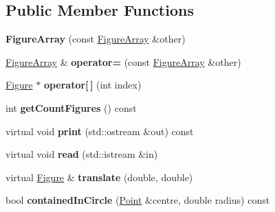 \subsection*{Public Member Functions}
\begin{DoxyCompactItemize}
\item 
\mbox{\label{class_figure_array_aebe53c961441949b5b066ebd58b5bcfc}} 
{\bfseries Figure\+Array} (const \mbox{\hyperlink{class_figure_array}{Figure\+Array}} \&other)
\item 
\mbox{\label{class_figure_array_a0b91d274913d3525a00ad31e39e47353}} 
\mbox{\hyperlink{class_figure_array}{Figure\+Array}} \& {\bfseries operator=} (const \mbox{\hyperlink{class_figure_array}{Figure\+Array}} \&other)
\item 
\mbox{\label{class_figure_array_acfc4b29699b22a7576e976ad9e27d161}} 
\mbox{\hyperlink{class_figure}{Figure}} $\ast$ {\bfseries operator\mbox{[}$\,$\mbox{]}} (int index)
\item 
\mbox{\label{class_figure_array_a897dc4b592ab671c57c03536085bf748}} 
int {\bfseries get\+Count\+Figures} () const
\item 
\mbox{\label{class_figure_array_af405934366bba58d2955c935722c1a5a}} 
virtual void {\bfseries print} (std\+::ostream \&out) const
\item 
\mbox{\label{class_figure_array_a98e620de3aabee70754700bba30d3151}} 
virtual void {\bfseries read} (std\+::istream \&in)
\item 
\mbox{\label{class_figure_array_a4266fe37471b9f57209f222411c21f5b}} 
virtual \mbox{\hyperlink{class_figure}{Figure}} \& {\bfseries translate} (double, double)
\item 
\mbox{\label{class_figure_array_a3def9684cbb77037f45f52b378fa4930}} 
bool {\bfseries contained\+In\+Circle} (\mbox{\hyperlink{struct_point}{Point}} \&centre, double radius) const
\item 
\mbox{\label{class_figure_array_a9188c4170fcda7ae6ef089aa3497c71b}} 

\end{DoxyCompactItemize}
